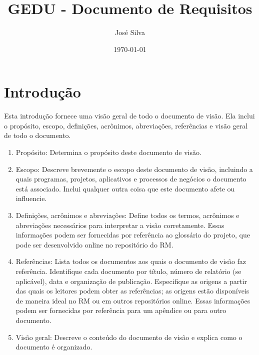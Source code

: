 \documentclass{report}
\title{GEDU - Documento de Requisitos}
\author{José Silva}
\date{\today}
\begin{document}
\thispagestyle{empty}
\maketitle
\newpage

\setcounter{page}{1}
\tableofcontents
\newpage

\listoffigures
\newpage

\listoftables
\newpage

\setcounter{page}{1}

\chapter{Introdução}


Esta introdução fornece uma visão geral de todo o documento de visão. Ela
inclui o propósito, escopo, definições, acrônimos, abreviações, referências e
visão geral de todo o documento.

\begin{enumerate}

	\item
	      Propósito: Determina o propósito deste documento de visão.

	\item
	      Escopo: Descreve brevemente o escopo deste documento de visão, incluindo a
	      quais programas, projetos, aplicativos e processos de negócios o documento está
	      associado. Inclui qualquer outra coisa que este documento afete ou influencie.

	\item
	      Definições, acrônimos e abreviações: Define todos os termos, acrônimos e
	      abreviações necessários para interpretar a visão corretamente. Essas
	      informações podem ser fornecidas por referência ao glossário do projeto, que
	      pode ser desenvolvido online no repositório do RM.

	\item
	      Referências: Lista todos os documentos aos quais o documento de visão faz
	      referência. Identifique cada documento por título, número de relatório (se
	      aplicável), data e organização de publicação. Especifique as origens a partir
	      das quais os leitores podem obter as referências; as origens estão disponíveis
	      de maneira ideal no RM ou em outros repositórios online. Essas informações
	      podem ser fornecidas por referência para um apêndice ou para outro documento.

	\item
	      Visão geral: Descreve o conteúdo do documento de visão e explica como o
	      documento é organizado.
\end{enumerate}
\end{document}
